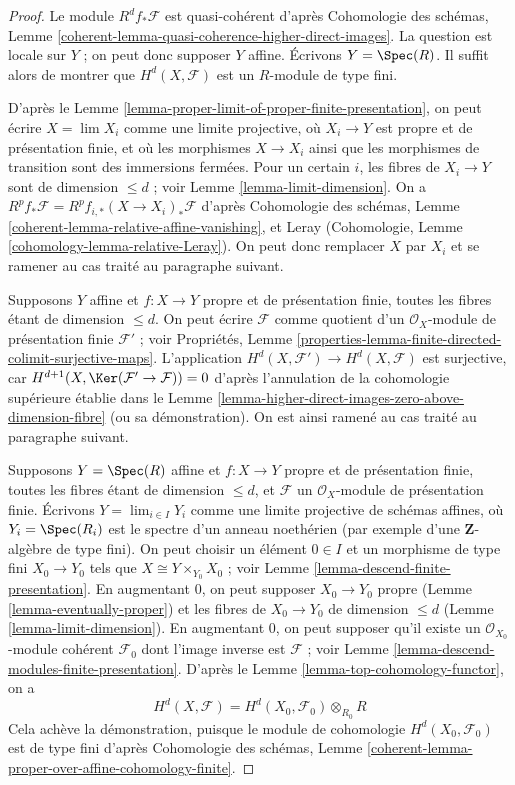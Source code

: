 \begin{proof}
Le module $R^df_*\mathcal{F}$ est quasi-cohérent d'après
Cohomologie des schémas, Lemme
\ref{coherent-lemma-quasi-coherence-higher-direct-images}.
La question est locale sur $Y$ ; on peut donc supposer $Y$ affine.
Écrivons $Y = \Spec(R)$. Il suffit alors de montrer que $H^d(X, \mathcal{F})$
est un $R$-module de type fini.

\medskip\noindent
D'après le Lemme \ref{lemma-proper-limit-of-proper-finite-presentation},
on peut écrire $X = \lim X_i$ comme une limite projective, où $X_i \to Y$ est propre
et de présentation finie, et où les morphismes $X \to X_i$
ainsi que les morphismes de transition sont des immersions fermées.
Pour un certain $i$, les fibres de $X_i \to Y$ sont de dimension $\leq d$ ;
voir Lemme \ref{lemma-limit-dimension}. On a
$R^pf_*\mathcal{F} = R^pf_{i, *}(X \to X_i)_*\mathcal{F}$ d'après
Cohomologie des schémas, Lemme \ref{coherent-lemma-relative-affine-vanishing},
et Leray (Cohomologie, Lemme \ref{cohomology-lemma-relative-Leray}).
On peut donc remplacer $X$ par $X_i$ et
se ramener au cas traité au paragraphe suivant.

\medskip\noindent
Supposons $Y$ affine et $f : X \to Y$ propre et de présentation finie,
toutes les fibres étant de dimension $\leq d$.
On peut écrire $\mathcal{F}$ comme quotient d'un
$\mathcal{O}_X$-module de présentation finie $\mathcal{F}'$ ; voir
Propriétés, Lemme
\ref{properties-lemma-finite-directed-colimit-surjective-maps}.
L'application $H^d(X, \mathcal{F}') \to H^d(X, \mathcal{F})$ est
surjective, car $H^{d + 1}(X, \Ker(\mathcal{F}' \to \mathcal{F})) = 0$
d'après l'annulation de la cohomologie supérieure établie dans le
Lemme \ref{lemma-higher-direct-images-zero-above-dimension-fibre}
(ou sa démonstration). On est ainsi ramené au cas traité au paragraphe suivant.

\medskip\noindent
Supposons $Y = \Spec(R)$ affine et $f : X \to Y$
propre et de présentation finie,
toutes les fibres étant de dimension $\leq d$, et $\mathcal{F}$ un
$\mathcal{O}_X$-module de présentation finie.
Écrivons $Y = \lim_{i \in I} Y_i$ comme une limite projective de schémas affines,
où $Y_i = \Spec(R_i)$ est le spectre d'un anneau noethérien
(par exemple d'une $\mathbf{Z}$-algèbre de type fini).
On peut choisir un élément $0 \in I$ et un morphisme de type fini
$X_0 \to Y_0$ tels que $X \cong Y \times_{Y_0} X_0$ ; voir
Lemme \ref{lemma-descend-finite-presentation}.
En augmentant $0$, on peut supposer $X_0 \to Y_0$ propre
(Lemme \ref{lemma-eventually-proper})
et les fibres de $X_0 \to Y_0$ de dimension $\leq d$
(Lemme \ref{lemma-limit-dimension}).
En augmentant $0$, on peut supposer qu'il existe un
$\mathcal{O}_{X_0}$-module cohérent $\mathcal{F}_0$ dont l'image
inverse est $\mathcal{F}$ ; voir
Lemme \ref{lemma-descend-modules-finite-presentation}.
D'après le Lemme \ref{lemma-top-cohomology-functor},
on a
$$
H^d(X, \mathcal{F}) = H^d(X_0, \mathcal{F}_0) \otimes_{R_0} R
$$
Cela achève la démonstration, puisque le module de cohomologie
$H^d(X_0, \mathcal{F}_0)$ est de type fini d'après
Cohomologie des schémas, Lemme
\ref{coherent-lemma-proper-over-affine-cohomology-finite}.
\end{proof}

